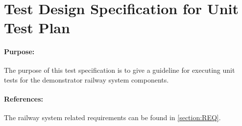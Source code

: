 \section{Test Design Specification for Unit Test Plan}

\paragraph{Purpose:} The purpose of this test specification is to give a guideline for executing unit tests for the demonstrator railway system components.
\paragraph{References:} The railway system related requirements can be found in \autoref{section:REQ}.

